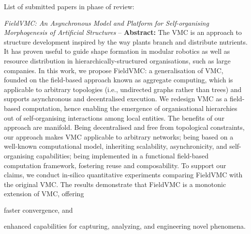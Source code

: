 \documentclass[runningheads]{llncs}
\newenvironment{inlinelist}{\begin{enumerate*}[label=\emph{(\roman*)}]}{\end{enumerate*}}
\begin{document}
    List of submitted papers in phase of review:
    \begin{enumerate}
        \item \emph{FieldVMC: An Asynchronous Model and Platform for Self-organising Morphogenesis of Artificial Structures} --
        \textbf{Abstract:}
        The VMC is an approach
        to structure development
        inspired by the way plants branch and distribute nutrients.
%
        It has proven useful
        to guide shape formation in modular robotics
        as well as
        resource distribution in hierarchically-structured organisations, such as large companies.
%
        In this work,
        we propose FieldVMC: a generalisation of VMC,
        founded on the field-based approach known as  aggregate computing,
        which is applicable to arbitrary topologies
        (i.e., undirected graphs rather than trees)
        and supports asynchronous and decentralised execution.
%
        We redesign VMC as a field-based computation,
        hence enabling the emergence of organisational hierarchies %
        out of self-organising interactions among local entities.
%
        The benefits of our approach are manifold.
%
        Being decentralised and free from topological constraints,
        our approach makes VMC applicable to arbitrary networks;
        being based on a well-known computational model,
        inheriting scalability, asynchronicity, and self-organising capabilities;
        being implemented in a functional field-based computation framework,
        fostering reuse and composability.
%
        To support our claims, we conduct in-silico quantitative experiments comparing FieldVMC with the original VMC.
        The results demonstrate that FieldVMC is a monotonic extension of VMC, offering
        \begin{inlinelist}
            \item faster convergence,
            and
            \item enhanced capabilities for capturing, analyzing, and engineering novel phenomena.
        \end{inlinelist}
    \end{enumerate}
\end{document}
